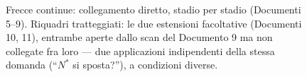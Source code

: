 \documentclass[11pt,a4paper]{article}
\begin{document}
\begin{figure}[htbp]
\caption{Frecce continue: collegamento diretto, stadio per stadio
(Documenti 5--9). Riquadri tratteggiati: le due estensioni facoltative
(Documenti 10, 11), entrambe aperte dallo scan del Documento 9 ma non
collegate fra loro --- due applicazioni indipendenti della stessa
domanda (``$N^*$ si sposta?''), a condizioni diverse.}
\end{figure}
\end{document}
